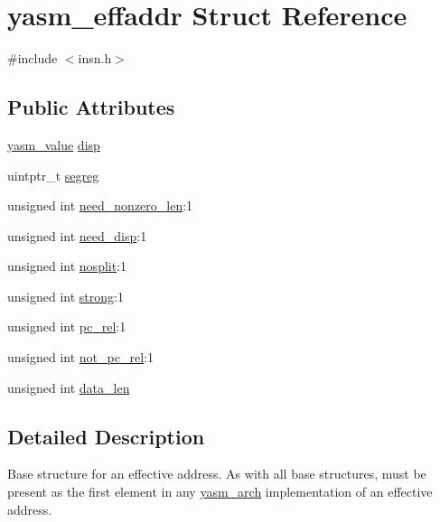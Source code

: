 \hypertarget{structyasm__effaddr}{\section{yasm\-\_\-effaddr Struct Reference}
\label{structyasm__effaddr}
}


{\ttfamily \#include $<$insn.\-h$>$}

\subsection*{Public Attributes}
\begin{DoxyCompactItemize}
\item 
\hyperlink{structyasm__value}{yasm\-\_\-value} \hyperlink{structyasm__effaddr_a56ca3771f045ae4a400c4d9256cb472c}{disp}
\item 
uintptr\-\_\-t \hyperlink{structyasm__effaddr_ae6539c0820d3b9a98fad42a547ea790a}{segreg}
\item 
unsigned int \hyperlink{structyasm__effaddr_abd02ae0cd1f72be0d7291f179cc87660}{need\-\_\-nonzero\-\_\-len}\-:1
\item 
unsigned int \hyperlink{structyasm__effaddr_af697fb5350c4730913e811afce1aa2dd}{need\-\_\-disp}\-:1
\item 
unsigned int \hyperlink{structyasm__effaddr_a6d3e48f8750aeea38499f04415ec1918}{nosplit}\-:1
\item 
unsigned int \hyperlink{structyasm__effaddr_a8fa5c904fc7b7e5517a461e73036ba41}{strong}\-:1
\item 
unsigned int \hyperlink{structyasm__effaddr_a0a3a4fb039306049fda3bc718ed33e2c}{pc\-\_\-rel}\-:1
\item 
unsigned int \hyperlink{structyasm__effaddr_ae825a88f0ee21a86093ec55065484167}{not\-\_\-pc\-\_\-rel}\-:1
\item 
unsigned int \hyperlink{structyasm__effaddr_a6e0ee976930fc59ad606672e7419c7da}{data\-\_\-len}
\end{DoxyCompactItemize}


\subsection{Detailed Description}
Base structure for an effective address. As with all base structures, must be present as the first element in any \hyperlink{coretype_8h_a8e0de61d73c940f0e7b6ef12e0dc1c70}{yasm\-\_\-arch} implementation of an effective address. 


